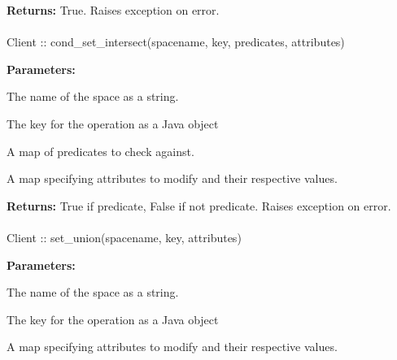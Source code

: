 \noindent\textbf{Returns:}
True.  Raises exception on error.

\paragraph{}
\label{api:java:cond_set_intersect}
\begin{javacode}
Client :: cond_set_intersect(spacename, key, predicates, attributes)
\end{javacode}
\funcdesc 

\noindent\textbf{Parameters:}
\begin{description}[labelindent=\widthof{{\code{predicates}}},leftmargin=*,noitemsep,nolistsep,align=right]
\item[\code{spacename}] The name of the space as a string.
\item[\code{key}] The key for the operation as a Java object
\item[\code{predicates}] A map of predicates to check against.
\item[\code{attributes}] A map specifying attributes to modify and their respective values.
\end{description}

\noindent\textbf{Returns:}
True if predicate, False if not predicate.  Raises exception on error.

\paragraph{}
\label{api:java:set_union}
\begin{javacode}
Client :: set_union(spacename, key, attributes)
\end{javacode}
\funcdesc 

\noindent\textbf{Parameters:}
\begin{description}[labelindent=\widthof{{\code{attributes}}},leftmargin=*,noitemsep,nolistsep,align=right]
\item[\code{spacename}] The name of the space as a string.
\item[\code{key}] The key for the operation as a Java object
\item[\code{attributes}] A map specifying attributes to modify and their respective values.
\end{description}

